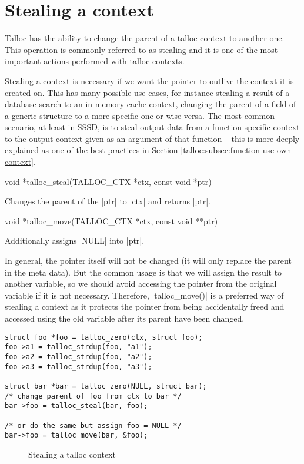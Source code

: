 \section{Stealing a context}
\label{talloc:stealing}

Talloc has the ability to change the parent of a talloc context to another
one. This operation is commonly referred to as stealing and it is one of
the most important actions performed with talloc contexts.

Stealing a context is necessary if we want the pointer to outlive the context it
is created on. This has many possible use cases, for instance stealing a result
of a database search to an in-memory cache context, changing the parent of a
field of a generic structure to a more specific one or wise versa. The most
common scenario, at least in SSSD, is to steal output data from a function-specific
context to the output context given as an argument of that function -- this is
more deeply explained as one of the best practices in Section 
\ref{talloc:subsec:function-use-own-context}.

\begin{funcproto}
void *talloc_steal(TALLOC_CTX *ctx, const void *ptr)
\end{funcproto}
\begin{funcdesc}
  Changes the parent of the |ptr| to |ctx| and returns |ptr|.
\end{funcdesc}
\begin{funcproto}
void *talloc_move(TALLOC_CTX *ctx, const void **ptr)
\end{funcproto}
\begin{funcdesc}
  Additionally assigns |NULL| into |ptr|.
\end{funcdesc}
\funclistend
In general, the pointer itself will not be changed (it will only replace the
parent in the meta data). But the common usage is that we will assign the
result to another variable, so we should avoid accessing the pointer from the
original variable if it is not necessary. Therefore, |talloc_move()| is a
preferred way of stealing a context as it protects the pointer from being
accidentally freed and accessed using the old variable after its parent have
been changed.

\begin{lstlisting}[caption={talloc_steal() and talloc_move()}]
struct foo *foo = talloc_zero(ctx, struct foo);
foo->a1 = talloc_strdup(foo, "a1");
foo->a2 = talloc_strdup(foo, "a2");
foo->a3 = talloc_strdup(foo, "a3");

struct bar *bar = talloc_zero(NULL, struct bar);
/* change parent of foo from ctx to bar */
bar->foo = talloc_steal(bar, foo);

/* or do the same but assign foo = NULL */
bar->foo = talloc_move(bar, &foo);
\end{lstlisting}

\begin{figure}[H]
  \centering
  
  \caption{Stealing a talloc context}
  \label{fig:steal}
\end{figure}